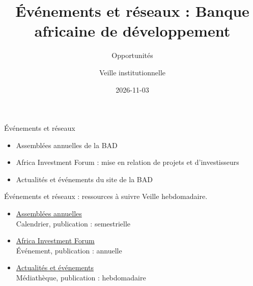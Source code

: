 \documentclass[aspectratio=169,11pt]{beamer}
\title{Événements et réseaux : Banque africaine de développement}
\subtitle{Opportunités}
\author{Veille institutionnelle}
\date{2026-11-03}
\begin{document}
\begin{frame}\titlepage\end{frame}

\begin{frame}{Événements et réseaux}
\begin{itemize}
\item Assemblées annuelles de la BAD
\item Africa Investment Forum : mise en relation de projets et d'investisseurs
\item Actualités et événements du site de la BAD
\end{itemize}
\end{frame}

\begin{frame}{Événements et réseaux : ressources à suivre}
\small
Veille hebdomadaire.
\begin{itemize}
\item \href{https://www.afdb.org/en/annual-meetings}{Assemblées annuelles}\\{\footnotesize Calendrier, publication : semestrielle}
\item \href{https://www.africainvestmentforum.com}{Africa Investment Forum}\\{\footnotesize Événement, publication : annuelle}
\item \href{https://www.afdb.org/en/news-and-events}{Actualités et événements}\\{\footnotesize Médiathèque, publication : hebdomadaire}
\end{itemize}
\end{frame}
\end{document}
